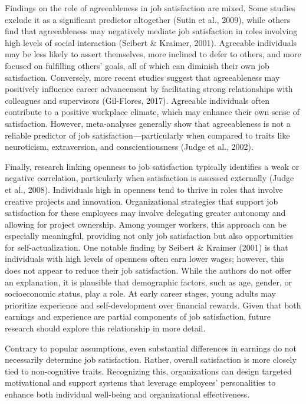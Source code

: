 \documentclass[
]{interact}
\begin{document}
Findings on the role of agreeableness in job satisfaction are mixed.
Some studies exclude it as a significant predictor altogether (Sutin et
al., 2009), while others find that agreeableness may negatively mediate
job satisfaction in roles involving high levels of social interaction
(Seibert \& Kraimer, 2001). Agreeable individuals may be less likely to
assert themselves, more inclined to defer to others, and more focused on
fulfilling others' goals, all of which can diminish their own job
satisfaction. Conversely, more recent studies suggest that agreeableness
may positively influence career advancement by facilitating strong
relationships with colleagues and supervisors (Gil-Flores, 2017).
Agreeable individuals often contribute to a positive workplace climate,
which may enhance their own sense of satisfaction. However,
meta-analyses generally show that agreeableness is not a reliable
predictor of job satisfaction---particularly when compared to traits
like neuroticism, extraversion, and conscientiousness (Judge et al.,
2002).

Finally, research linking openness to job satisfaction typically
identifies a weak or negative correlation, particularly when
satisfaction is assessed externally (Judge et al., 2008). Individuals
high in openness tend to thrive in roles that involve creative projects
and innovation. Organizational strategies that support job satisfaction
for these employees may involve delegating greater autonomy and allowing
for project ownership. Among younger workers, this approach can be
especially meaningful, providing not only job satisfaction but also
opportunities for self-actualization. One notable finding by Seibert \&
Kraimer (2001) is that individuals with high levels of openness often
earn lower wages; however, this does not appear to reduce their job
satisfaction. While the authors do not offer an explanation, it is
plausible that demographic factors, such as age, gender, or
socioeconomic status, play a role. At early career stages, young adults
may prioritize experience and self-development over financial rewards.
Given that both earnings and experience are partial components of job
satisfaction, future research should explore this relationship in more
detail.

Contrary to popular assumptions, even substantial differences in
earnings do not necessarily determine job satisfaction. Rather, overall
satisfaction is more closely tied to non-cognitive traits. Recognizing
this, organizations can design targeted motivational and support systems
that leverage employees' personalities to enhance both individual
well-being and organizational effectiveness.
\end{document}
